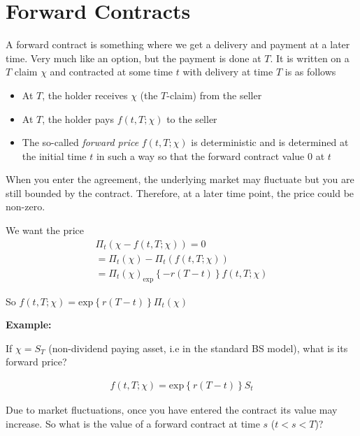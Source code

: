 \section{Forward Contracts}
\noindent A forward contract is something where we get a delivery and payment at a later time. Very much like an option, but the payment is done at $T$. It is written on a $T$ claim $\chi$ and contracted at some time $t$ with delivery at time $T$ is as follows\par
\begin{itemize}
  \item At $T$, the holder receives $\chi$ (the $T$-claim) from the seller
  \item At $T$, the holder pays $f(t,T;\chi)$ to the seller
  \item The so-called \textit{forward price} $f(t,T;\chi)$ is deterministic and is determined at the initial time $t$ in such a way so that the forward contract value 0 at $t$
\end{itemize}
\par\bigskip
\noindent When you enter the agreement, the underlying market may fluctuate but you are still bounded by the contract. Therefore, at a later time point, the price could be non-zero.\par
\noindent We want the price
\begin{equation*}
  \begin{gathered}
    \Pi_t(\chi-f(t,T;\chi)) = 0\\
    = \Pi_t(\chi)-\Pi_t(f(t,T;\chi))\\
    =\Pi_t(\chi)_\text{exp}\left\{-r(T-t)\right\}f(t,T;\chi)
  \end{gathered}
\end{equation*}\par
\noindent So $f(t,T;\chi) = \text{exp}\left\{r(T-t)\right\}\Pi_t(\chi)$\par
\par\bigskip
\noindent\textbf{Example:}\par
\noindent If $\chi =S_T$ (non-dividend paying asset, i.e in the standard BS model), what is its forward price?\par
\begin{equation*}
  \begin{gathered}
    f(t,T;\chi)=\text{exp}\left\{r(T-t)\right\}S_t
  \end{gathered}
\end{equation*}
\par\bigskip
\noindent Due to market fluctuations, once you have entered the contract its value may increase. So what is the value of a forward contract at time $s$ ($t<s<T$)?\par
